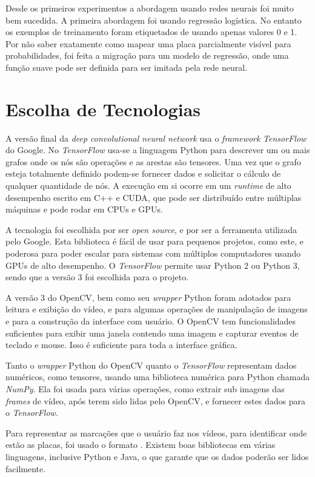 Desde os primeiros experimentos a abordagem usando redes neurais foi muito bem
sucedida. A primeira abordagem foi usando regressão logística. No entanto os
exemplos de treinamento foram etiquetados de usando apenas valores 0 e 1. Por
não saber exatamente como mapear uma placa parcialmente visível para
probabilidades, foi feita a migração para um modelo de regressão, onde uma
função suave pode ser definida para ser imitada pela rede neural.

\section{Escolha de Tecnologias} \label{sec:cap5_tecnol}
A versão final da \emph{deep convolutional neural network} usa o
\emph{framework} \emph{TensorFlow} do Google.
No \emph{TensorFlow} usa-se a linguagem Python para descrever um ou mais
grafos onde
os nós são operações e as arestas são tensores. Uma vez que o grafo esteja
totalmente definido podem-se fornecer dados e solicitar o cálculo de qualquer
quantidade de nós. A execução em si ocorre em um \emph{runtime} de alto
desempenho escrito em C++ e CUDA, que pode ser distribuído entre múltiplas
máquinas e pode rodar em CPUs e GPUs.

A tecnologia foi escolhida por ser \emph{open source}, e por ser a ferramenta
utilizada pelo Google. Esta biblioteca é fácil de usar para pequenos projetos,
como este, e poderosa para poder escalar para sistemas com múltiplos
computadores usando GPUs de alto desempenho. O \emph{TensorFlow} permite usar
Python 2 ou Python 3, sendo que a versão 3 foi escolhida para o projeto.

A versão 3 do OpenCV, bem como seu \emph{wrapper} Python foram adotados para
leitura e exibição do vídeo, e para algumas operações de manipulação de
imagens e para a construção da interface com usuário. O OpenCV tem
funcionalidades suficientes para exibir uma janela contendo
uma imagem e capturar eventos de teclado e mouse. Isso é suficiente para toda a
interface gráfica.

Tanto o \emph{wrapper} Python do OpenCV quanto o \emph{TensorFlow} representam
dados numéricos, como tensores, usando uma biblioteca numérica para
Python chamada \emph{NumPy}. Ela foi usada para várias operações, como
extrair sub imagens
das \emph{frames} de vídeo, após terem sido lidas pelo OpenCV, e fornecer
estes dados para o \emph{TensorFlow}.

Para representar as marcações que o usuário faz nos vídeos, para identificar
onde estão as placas, foi usado o formato .
Existem boas
bibliotecas em várias linguagens, inclusive Python e Java, o que garante que os
dados poderão ser lidos facilmente.

